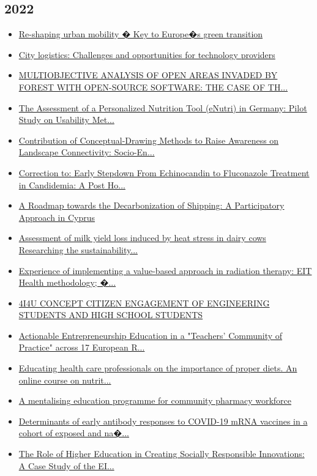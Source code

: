 \subsection*{2022}
\begin{itemize}[leftmargin=*, itemsep=0em, label=\textbullet]
\small
\item \href{https://doi.org/10.1016/j.urbmob.2022.100014}{Re-shaping urban mobility � Key to Europe�s green transition}
\item \href{https://doi.org/10.1016/j.urbmob.2022.100020}{City logistics: Challenges and opportunities for technology providers}
\item \href{https://doi.org/10.5194/isprs-archives-XLVIII-4-W1-2022-357-2022}{MULTIOBJECTIVE ANALYSIS OF OPEN AREAS INVADED BY FOREST WITH OPEN-SOURCE SOFTWARE: THE CASE OF TH...}
\item \href{https://doi.org/10.2196/34497}{The Assessment of a Personalized Nutrition Tool (eNutri) in Germany: Pilot Study on Usability Met...}
\item \href{https://doi.org/10.3390/su14137975}{Contribution of Conceptual-Drawing Methods to Raise Awareness on Landscape Connectivity: Socio-En...}
\item \href{https://doi.org/10.1093/ofid/ofac180}{Correction to: Early Stepdown From Echinocandin to Fluconazole Treatment in Candidemia: A Post Ho...}
\item \href{https://doi.org/10.3390/su14042185}{A Roadmap towards the Decarbonization of Shipping: A Participatory Approach in Cyprus}
\item \href{https://doi.org/10.51202/9783181024065-75}{Assessment of milk yield loss induced by heat stress in dairy cows Researching the sustainability...}
\item \href{https://doi.org/10.47470/0044-197X-2022-66-3-201-207}{Experience of implementing a value-based approach in radiation therapy: EIT Health methodology; �...}
\item \href{https://doi.org/10.5821/conference-9788412322262.1419}{4I4U CONCEPT CITIZEN ENGAGEMENT OF ENGINEERING STUDENTS AND HIGH SCHOOL STUDENTS}
\item \href{https://doi.org/10.1109/FIE56618.2022.9962506}{Actionable Entrepreneurship Education in a "Teachers' Community of Practice" across 17 European R...}
\item \href{https://doi.org/10.1080/09637486.2022.2123908}{Educating health care professionals on the importance of proper diets. An online course on nutrit...}
\item \href{https://doi.org/10.46542/pe.2022.221.7787}{A mentalising education programme for community pharmacy workforce}
\item \href{https://doi.org/10.1016/j.ebiom.2021.103805}{Determinants of early antibody responses to COVID-19 mRNA vaccines in a cohort of exposed and na�...}
\item \href{https://doi.org/10.1007/978-3-030-84044-0_9}{The Role of Higher Education in Creating Socially Responsible Innovations: A Case Study of the EI...}
\end{itemize}

